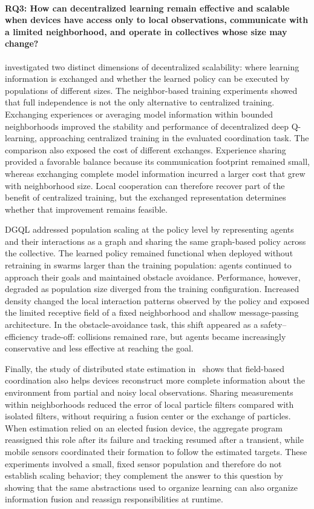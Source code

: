 \paragraph{RQ3: How can decentralized learning remain effective and scalable
when devices have access only to local observations, communicate with a limited
neighborhood, and operate in collectives whose size may change?}
 investigated two distinct dimensions of decentralized scalability:
 where learning information is exchanged and whether the learned policy 
 can be executed by populations of different sizes.
%
The neighbor-based training experiments showed that full independence 
 is not the only alternative to centralized training.
%
Exchanging experiences or averaging model information within bounded neighborhoods 
improved the stability and performance of decentralized deep Q-learning, 
approaching centralized training in the evaluated coordination task.
%
The comparison also exposed the cost of different exchanges. 
%
Experience sharing provided a favorable balance because its communication footprint remained small,
 whereas exchanging complete model information incurred a larger cost that grew with neighborhood size.
% 
Local cooperation can therefore recover part of the benefit of centralized training, 
 but the exchanged representation determines whether that improvement remains feasible.

DGQL addressed population scaling at the policy level by representing agents 
 and their interactions as a graph and sharing the same graph-based policy across the collective.
%
The learned policy remained functional when deployed without retraining 
 in swarms larger than the training population: 
 agents continued to approach their goals and maintained obstacle avoidance.
%
Performance, however, 
 degraded as population size diverged from the training configuration. 
% 
Increased density changed the local interaction patterns observed by the policy 
 and exposed the limited receptive field of a fixed neighborhood 
 and shallow message-passing architecture. 
% 
In the obstacle-avoidance task, this shift appeared as a safety--efficiency trade-off:
 collisions remained rare, but agents became increasingly conservative and less effective at reaching the goal.

Finally,
 the study of distributed state estimation in~
 shows that field-based coordination also helps devices reconstruct
 more complete information about the environment from partial and noisy local observations.
%
Sharing measurements within neighborhoods reduced the error of local particle filters
 compared with isolated filters, without requiring a fusion center or the exchange of particles.
%
When estimation relied on an elected fusion device,
 the aggregate program reassigned this role after its failure
 and tracking resumed after a transient,
 while mobile sensors coordinated their formation to follow the estimated targets.
%
These experiments involved a small, fixed sensor population
 and therefore do not establish scaling behavior;
 they complement the answer to this question by showing that
 the same abstractions used to organize learning can also organize
 information fusion and reassign responsibilities at runtime.

